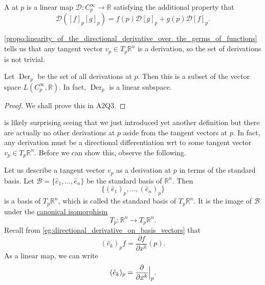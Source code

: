 \documentclass[notoc,notitlepage]{tufte-book}
\DeclareMathOperator{\Der}{Der}
\begin{document}
\begin{defn}[Derivation]\label{defn:derivation}
  A  at $p$ is a linear map $\mathcal{D} : C_p^\infty \to
  \mathbb{R}$ satisfying the additional property that
  \begin{equation*}
    \mathcal{D}([f]_p [g]_p) = f(p) \mathcal{D}[g]_p + g(p) \mathcal{D}[f]_p.
  \end{equation*}
\end{defn}

\begin{remark}
  \cref{propo:linearity_of_the_directional_derivative_over_the_germs_of_functions}
  tells us that any tangent vector $v_p \in T_p \mathbb{R}^n$ is a derivation, so
  the set of derivations is not trivial.
\end{remark}

\begin{propo}\label{propo:set_of_derivations_as_a_space}
  Let $\Der_p$ be the set of all derivations at $p$. Then this is a subset of the
  vector space $L(C_p^\infty, \mathbb{R})$. In fact, $\Der_p$ is a linear subspace.
\end{propo}

\begin{proof}
  We shall prove this in A2Q3.
\end{proof}

 is likely surprising seeing that we just introduced yet another
definition but there are actually no other derivations at $p$ aside from the tangent
vectors at $p$. In fact, any derivation must be a directional differentiation wrt to
some tangent vector $v_p \in T_p \mathbb{R}^n$. Before we can show this, observe the
following.

 Let us describe a tangent vector $v_p$ as a derivation at $p$ in
terms of the standard basis. Let $\mathcal{B} = \{ \hat{e}_1, \ldots, \hat{e}_n \}$
be the standard basis of $\mathbb{R}^n$. Then
\begin{equation*}
  \{ (\hat{e}_1)_p, \ldots, (\hat{e}_n)_p \}
\end{equation*}
is a basis of $T_p \mathbb{R}^n$, which is called the standard basis of
$T_p \mathbb{R}^n$.  It is the image of $\mathcal{B}$ under the
\hyperref[propo:canonical_bijection_from_t_p_r_n_to_r_n_]{canonical isomorphism}
\begin{equation*}
  T_p : \mathbb{R}^n \to T_p \mathbb{R}^n.
\end{equation*}
Recall from \cref{eg:directional_derivative_on_basis_vectors} that
\begin{equation*}
  (\hat{e}_k)_p f = \frac{\partial f}{\partial x^k}(p).
\end{equation*}
As a linear map, we can write
\begin{equation}\label{eq:directional_derivative_on_basis_vectors_linear}
  (\hat{e}_k)_p = \frac{\partial}{\partial x^k} \Big|_{p}^{}.
\end{equation}
\end{document}
